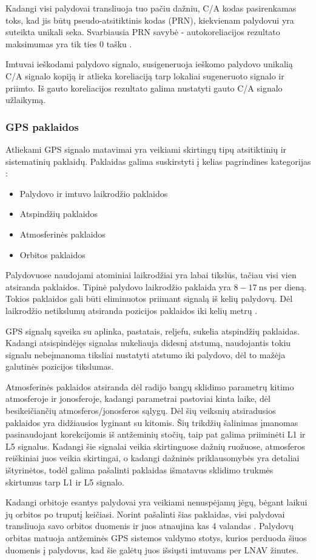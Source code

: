 \documentclass[main.tex]{subfiles}
\begin{document}
Kadangi visi palydovai transliuoja tuo pačiu dažniu, C/A kodas pasirenkamas toks,
kad jis būtų pseudo-atsitiktinis kodas (PRN), kiekvienam palydovui yra suteikta unikali seka.
Svarbiausia PRN savybė - autokoreliacijos rezultato maksimumas yra tik
ties 0 tašku \cite{OCHIN202121_chapter2}.

Imtuvai ieškodami palydovo signalo, susigeneruoja ieškomo palydovo unikalią C/A signalo
kopiją ir atlieka koreliaciją tarp lokaliai sugeneruoto signalo ir priimto.
Iš gauto koreliacijos rezultato galima nustatyti gauto C/A signalo užlaikymą.

\subsubsection {GPS paklaidos}

Atliekami GPS signalo matavimai yra veikiami skirtingų tipų atsitiktinių ir sistematinių
paklaidų. Paklaidas galima suskirstyti į kelias pagrindines kategorijas \cite{KUMAR20213_chapter1}:

\begin{itemize}
    \item Palydovo ir imtuvo laikrodžio paklaidos
    \item Atspindžių paklaidos
    \item Atmosferinės paklaidos
    \item Orbitos paklaidos
\end{itemize}

Palydovuose naudojami atominiai laikrodžiai yra labai tikslūs, tačiau visi vien atsiranda paklaidos.
Tipinė palydovo laikrodžio paklaida yra $8-17\ \mathrm{ns}$ per dieną. Tokios paklaidos
gali būti eliminuotos priimant signalą iš kelių palydovų. Dėl laikrodžio netikslumų atsiranda
pozicijos paklaidos iki kelių metrų \cite{KUMAR20213_chapter1}.

GPS signalų sąveika su aplinka, pastatais, reljefu, sukelia atspindžių paklaidas. Kadangi
atsispindėjęs signalas nukeliauja didesnį atstumą, naudojantis tokiu signalu nebeįmanoma
tiksliai nustatyti atstumo iki palydovo, dėl to mažėja galutinės pozicijos tikslumas.

Atmosferinės paklaidos atsiranda dėl radijo bangų sklidimo parametrų kitimo atmosferoje ir
jonosferoje, kadangi parametrai pastoviai kinta laike, dėl besikeičiančių atmosferos/jonosferos
sąlygų. Dėl šių veiksnių atsiradusios paklaidos yra didžiausios lyginant su kitomis.
Šių trikdžių šalinimas įmanomas pasinaudojant korekcijomis iš antžeminių stočių, taip
pat galima priiminėti L1 ir L5 signalus. Kadangi šie signalai veikia skirtinguose
dažnių ruožuose, atmosferos reiškiniai juos veikia skirtingai, o kadangi
dažninės priklausomybės yra detaliai ištyrinėtos, todėl galima pašalinti
paklaidas išmatavus sklidimo trukmės skirtumus tarp L1 ir L5 signalo.

Kadangi orbitoje esantys palydovai yra veikiami nenuspėjamų jėgų, bėgant laikui jų orbitos
po truputį keičiasi. Norint pašalinti šias paklaidas, visi palydovai transliuoja savo
orbitos duomenis ir juos atnaujina kas 4 valandas \cite{sps_standard}. Palydovų orbitas
matuoja antžeminės GPS sistemos valdymo stotys, kurios perduoda šiuos duomenis
į palydovus, kad šie galėtų juos išsiųsti imtuvams per LNAV žinutes.
\end{document}
